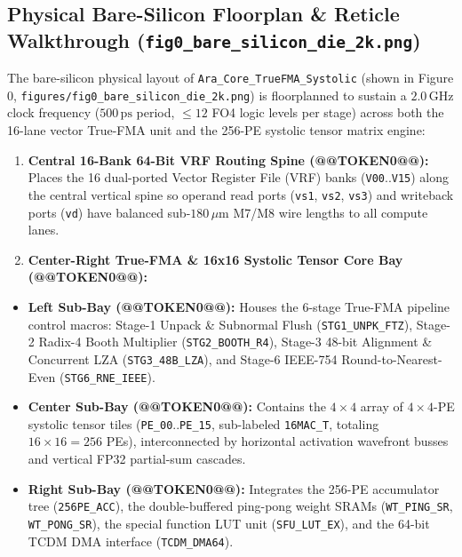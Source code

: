 \documentclass[journal,10pt,twocolumn]{IEEEtran}
\begin{document}
\subsection{Physical Bare-Silicon Floorplan \& Reticle Walkthrough (\texttt{fig0\_bare\_silicon\_die\_2k.png})}

The bare-silicon physical layout of \texttt{Ara\_Core\_TrueFMA\_Systolic} (shown in Figure 0, \texttt{figures/fig0\_bare\_silicon\_die\_2k.png}) is floorplanned to sustain a $2.0\,\mathrm{GHz}$ clock frequency ($500\,\mathrm{ps}$ period, $\le 12$ FO4 logic levels per stage) across both the 16-lane vector True-FMA unit and the 256-PE systolic tensor matrix engine:

\begin{enumerate}
  \item \textbf{Central 16-Bank 64-Bit VRF Routing Spine (@@TOKEN0@@):} Places the 16 dual-ported Vector Register File (VRF) banks (\texttt{V00}..\texttt{V15}) along the central vertical spine so operand read ports (\texttt{vs1}, \texttt{vs2}, \texttt{vs3}) and writeback ports (\texttt{vd}) have balanced sub-$180\,\mu\mathrm{m}$ M7/M8 wire lengths to all compute lanes.
  \item \textbf{Center-Right True-FMA \& 16x16 Systolic Tensor Core Bay (@@TOKEN0@@):}
\end{enumerate}
\begin{itemize}
  \item \textbf{Left Sub-Bay (@@TOKEN0@@):} Houses the 6-stage True-FMA pipeline control macros: Stage-1 Unpack \& Subnormal Flush (\texttt{STG1\_UNPK\_FTZ}), Stage-2 Radix-4 Booth Multiplier (\texttt{STG2\_BOOTH\_R4}), Stage-3 48-bit Alignment \& Concurrent LZA (\texttt{STG3\_48B\_LZA}), and Stage-6 IEEE-754 Round-to-Nearest-Even (\texttt{STG6\_RNE\_IEEE}).
  \item \textbf{Center Sub-Bay (@@TOKEN0@@):} Contains the $4 \times 4$ array of $4 \times 4$-PE systolic tensor tiles (\texttt{PE\_00}..\texttt{PE\_15}, sub-labeled \texttt{16MAC\_T}, totaling $16 \times 16 = 256$ PEs), interconnected by horizontal activation wavefront busses and vertical FP32 partial-sum cascades.
  \item \textbf{Right Sub-Bay (@@TOKEN0@@):} Integrates the 256-PE accumulator tree (\texttt{256PE\_ACC}), the double-buffered ping-pong weight SRAMs (\texttt{WT\_PING\_SR}, \texttt{WT\_PONG\_SR}), the special function LUT unit (\texttt{SFU\_LUT\_EX}), and the 64-bit TCDM DMA interface (\texttt{TCDM\_DMA64}).
\end{itemize}
\end{document}
